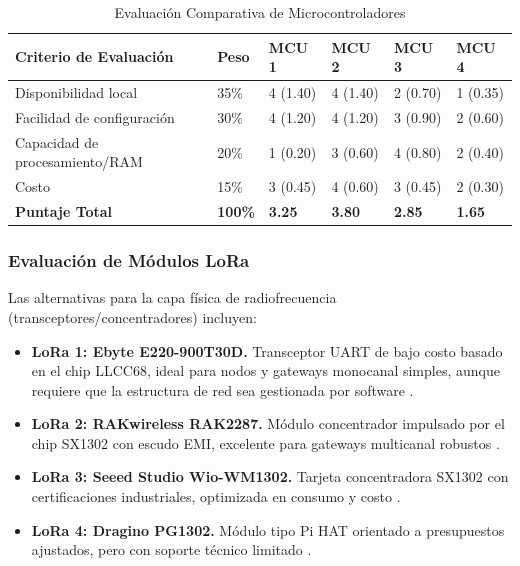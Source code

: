 \begin{table}[H]
    \centering
    \renewcommand{\arraystretch}{1.5}
    \caption{Evaluación Comparativa de Microcontroladores}
    \label{tabla:evaluacion_mcu}
    \begin{tabular}{|p{4.5cm}|p{1.5cm}|p{1.5cm}|p{1.5cm}|p{1.5cm}|p{1.5cm}|}
        \hline
        \textbf{Criterio de Evaluación} & \textbf{Peso}  & \textbf{MCU 1} & \textbf{MCU 2} & \textbf{MCU 3} & \textbf{MCU 4} \\ \hline
        Disponibilidad local            & 35\%           & 4 (1.40)       & 4 (1.40)       & 2 (0.70)       & 1 (0.35)       \\ \hline
        Facilidad de configuración      & 30\%           & 4 (1.20)       & 4 (1.20)       & 3 (0.90)       & 2 (0.60)       \\ \hline
        Capacidad de procesamiento/RAM  & 20\%           & 1 (0.20)       & 3 (0.60)       & 4 (0.80)       & 2 (0.40)       \\ \hline
        Costo                           & 15\%           & 3 (0.45)       & 4 (0.60)       & 3 (0.45)       & 2 (0.30)       \\ \hline
        \textbf{Puntaje Total}          & \textbf{100\%} & \textbf{3.25}  & \textbf{3.80}  & \textbf{2.85}  & \textbf{1.65}  \\ \hline
    \end{tabular}
\end{table}

\subsubsection{Evaluación de Módulos LoRa}

Las alternativas para la capa física de radiofrecuencia (transceptores/concentradores) incluyen:
\begin{itemize}
    \item \textbf{LoRa 1: Ebyte E220-900T30D.} Transceptor UART de bajo costo basado en el chip LLCC68, ideal para nodos y gateways monocanal simples, aunque requiere que la estructura de red sea gestionada por software \cite{nb_lora_1}.
    \item \textbf{LoRa 2: RAKwireless RAK2287.} Módulo concentrador impulsado por el chip SX1302 con escudo EMI, excelente para gateways multicanal robustos \cite{nb_lora_13}.
    \item \textbf{LoRa 3: Seeed Studio Wio-WM1302.} Tarjeta concentradora SX1302 con certificaciones industriales, optimizada en consumo y costo \cite{nb_lora_13_seeed}.
    \item \textbf{LoRa 4: Dragino PG1302.} Módulo tipo Pi HAT orientado a presupuestos ajustados, pero con soporte técnico limitado \cite{nb_lora_13_dragino}.
\end{itemize}

